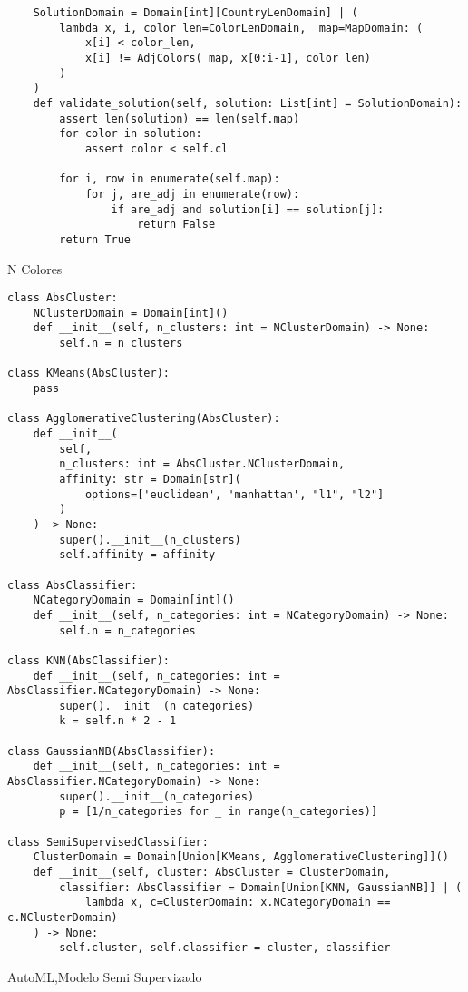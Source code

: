 \begin{codesample}
\begin{listing}[!ht]
\begin{verbatim}
    SolutionDomain = Domain[int][CountryLenDomain] | (
        lambda x, i, color_len=ColorLenDomain, _map=MapDomain: (
            x[i] < color_len,
            x[i] != AdjColors(_map, x[0:i-1], color_len)
        )
    )
    def validate_solution(self, solution: List[int] = SolutionDomain):
        assert len(solution) == len(self.map)
        for color in solution:
            assert color < self.cl

        for i, row in enumerate(self.map):
            for j, are_adj in enumerate(row):
                if are_adj and solution[i] == solution[j]:
                    return False
        return True
    \end{verbatim}
    \caption{N Colores}
    \label{lst:colors}
\end{listing}


\begin{listing}[!ht]
    \begin{verbatim}
class AbsCluster:
    NClusterDomain = Domain[int]()
    def __init__(self, n_clusters: int = NClusterDomain) -> None:
        self.n = n_clusters

class KMeans(AbsCluster):
    pass

class AgglomerativeClustering(AbsCluster):
    def __init__(
        self,
        n_clusters: int = AbsCluster.NClusterDomain,
        affinity: str = Domain[str](
            options=['euclidean', 'manhattan', "l1", "l2"]
        )
    ) -> None:
        super().__init__(n_clusters)
        self.affinity = affinity

class AbsClassifier:
    NCategoryDomain = Domain[int]()
    def __init__(self, n_categories: int = NCategoryDomain) -> None:
        self.n = n_categories

class KNN(AbsClassifier):
    def __init__(self, n_categories: int = AbsClassifier.NCategoryDomain) -> None:
        super().__init__(n_categories)
        k = self.n * 2 - 1

class GaussianNB(AbsClassifier):
    def __init__(self, n_categories: int = AbsClassifier.NCategoryDomain) -> None:
        super().__init__(n_categories)
        p = [1/n_categories for _ in range(n_categories)]

class SemiSupervisedClassifier:
    ClusterDomain = Domain[Union[KMeans, AgglomerativeClustering]]()
    def __init__(self, cluster: AbsCluster = ClusterDomain,
        classifier: AbsClassifier = Domain[Union[KNN, GaussianNB]] | (
            lambda x, c=ClusterDomain: x.NCategoryDomain == c.NClusterDomain)
    ) -> None:
        self.cluster, self.classifier = cluster, classifier
    \end{verbatim}
    \caption{AutoML,Modelo Semi Supervizado}
    \label{lst:automl}
\end{listing}

\end{codesample}
